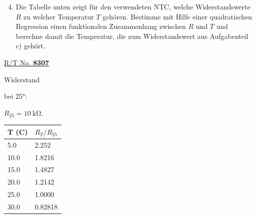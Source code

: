 \begin{aufgabe}
	\begin{minipage}{0.48\textwidth}
		\begin{enumerate}[label=\alph*), itemsep=0mm, parsep=0mm]
			\setcounter{enumi}{3}
			\item Die Tabelle unten zeigt für den verwendeten NTC, welche Widerstandswerte $R$ zu welcher Temperatur $T$ gehören. Bestimme mit Hilfe einer quadratischen Regression einen funktionalen Zusammenhang zwischen $R$ und $T$ und berechne damit die Temperatur, die zum Widerstandswert aus Aufgabenteil c) gehört.
		\end{enumerate}
	\end{minipage}
	\hfill
	\begin{minipage}{0.48\textwidth}
		\begin{tcolorbox}
			\begin{minipage}{0.48\textwidth}
				\href{https://pdf1.alldatasheet.com/datasheet-pdf/view/509832/EPCOS/G1541.html}{R/T No. \textbf{8307}}
				
				\bigskip
				Widerstand
				
				bei $\ang{25}$: 
				
				$R_{25}=\SI{10}{\kilo\ohm}$.
				
				\vspace{2\baselineskip}
			\end{minipage}
			\hfill
			\begin{minipage}{0.48\textwidth}
				\begin{tabular}{l | l }
					T (C) & $R_T/R_{25}$ \\ \hline
					5.0 & 2.252 \\ \hline
					10.0 & 1.8216 \\ \hline
					15.0 & 1.4827 \\ \hline
					20.0 & 1.2142 \\ \hline
					25.0 & 1.0000 \\ \hline
					30.0 & 0.82818 \\ \hline
				\end{tabular}
			\end{minipage}
		\end{tcolorbox}
	\end{minipage}
\end{aufgabe}

